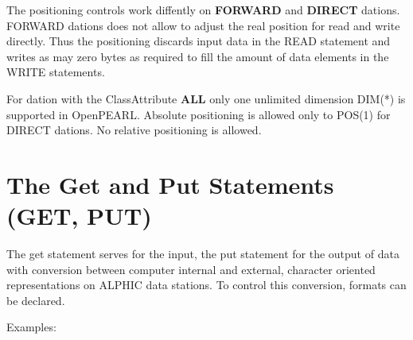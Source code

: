 \begin{added}
The positioning controls work diffently on {\bf FORWARD} and {\bf DIRECT}
dations. FORWARD dations does not allow to adjust the real position for read
and write directly. 
Thus the positioning discards input data in the READ statement and 
writes as may zero bytes as required to fill the amount of data elements
in the WRITE statements.
\end{added}

\begin{added}
For dation with the ClassAttribute {\bf ALL} only one unlimited dimension
DIM(*) is supported in OpenPEARL.
Absolute positioning is allowed only to POS(1) for DIRECT dations.
No relative positioning is allowed.
\end{added}

\section{The Get and Put Statements (GET, PUT)}    %
\label{sec_get_put}

The get statement serves for the input, the put statement for the
output of data with conversion between computer internal and external,
character oriented representations on ALPHIC data stations. To control
this conversion, formats can be declared.

Examples:

